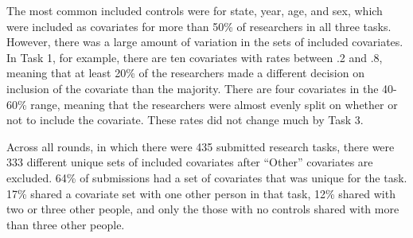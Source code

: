 \documentclass[
  letterpaper,
  DIV=11,
  numbers=noendperiod]{scrartcl}
\begin{document}
The most common included controls were for state, year, age, and sex,
which were included as covariates for more than 50\% of researchers in
all three tasks. However, there was a large amount of variation in the
sets of included covariates. In Task 1, for example, there are ten
covariates with rates between .2 and .8, meaning that at least 20\% of
the researchers made a different decision on inclusion of the covariate
than the majority. There are four covariates in the 40-60\% range,
meaning that the researchers were almost evenly split on whether or not
to include the covariate. These rates did not change much by Task 3.

Across all rounds, in which there were 435 submitted research tasks,
there were 333 different unique sets of included covariates after
``Other'' covariates are excluded. 64\% of submissions had a set of
covariates that was unique for the task. 17\% shared a covariate set
with one other person in that task, 12\% shared with two or three other
people, and only the those with no controls shared with more than three
other people.
\end{document}
